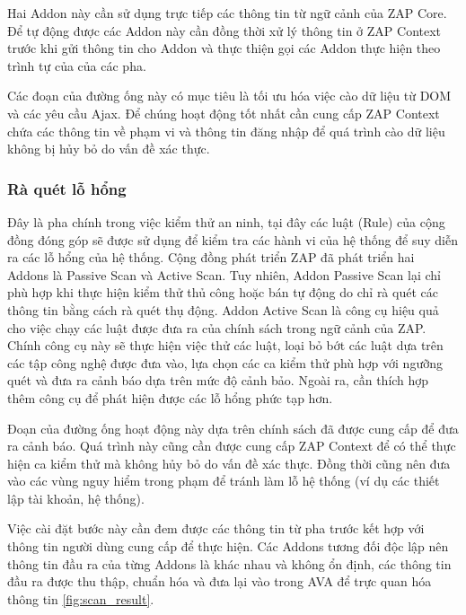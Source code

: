 \documentclass[./../main.tex]{subfiles}
\begin{document}
Hai Addon này cần sử dụng trực tiếp các thông tin từ ngữ cảnh của ZAP Core.
Để tự động được các Addon này cần đồng thời xử lý thông tin ở ZAP Context
trước khi gửi thông tin cho Addon và thực thiện gọi các Addon thực hiện
theo trình tự của của các pha.

Các đoạn của đường ống này có mục tiêu là tối ưu hóa việc cào dữ liệu từ
DOM và các yêu cầu Ajax. Để chúng hoạt động tốt nhất cần cung cấp
ZAP Context chứa các thông tin về phạm vi và thông tin đăng nhập để quá
trình cào dữ liệu không bị hủy bỏ do vấn đề xác thực.

\subsubsection{Rà quét lỗ hổng}

Đây là pha chính trong việc kiểm thử an ninh, tại đây các luật (Rule)
của cộng đồng đóng góp sẽ được sử dụng để kiểm tra các hành vi của hệ
thống để suy diễn ra các lỗ hổng của hệ thống. Cộng đồng phát triển ZAP
đã phát triển hai Addons là Passive Scan và Active Scan. Tuy nhiên,
Addon Passive Scan lại chỉ phù hợp khi thực hiện kiểm thử thủ công hoặc bán
tự động do chỉ rà quét các thông tin bằng cách rà quét thụ động. Addon Active Scan
là công cụ hiệu quả cho việc chạy các luật được đưa ra của chính sách trong
ngữ cảnh của ZAP. Chính công cụ này sẽ thực hiện việc thử các luật, loại bỏ
bớt các luật dựa trên các tập công nghệ được đưa vào, lựa chọn các ca kiểm
thử phù hợp với ngưỡng quét và đưa ra cảnh báo dựa trên mức độ cảnh bảo. Ngoài ra,
cần thích hợp thêm công cụ để phát hiện được các lỗ hổng phức tạp hơn.

Đoạn của đường ống hoạt động này dựa trên chính sách đã được cung cấp để đưa ra
cảnh báo. Quá trình này cũng cần được cung cấp ZAP Context để có thể thực
hiện ca kiểm thử mà không hủy bỏ do vấn đề xác thực. Đồng thời cũng nên đưa
vào các vùng nguy hiểm trong phạm để tránh làm lỗ hệ thống (ví dụ các
thiết lập tài khoản, hệ thống).

Việc cài đặt bước này cần đem được các thông tin từ pha trước kết hợp
với thông tin người dùng cung cấp để thực hiện. Các Addons tương đối độc
lập nên thông tin đầu ra của từng Addons là khác nhau và không ổn định,
các thông tin đầu ra được thu thập, chuẩn hóa và đưa lại vào trong AVA
để trực quan hóa thông tin \ref{fig:scan_result}.
\end{document}
